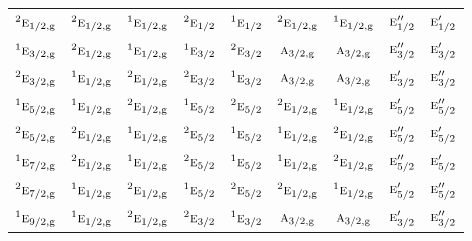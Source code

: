 \documentclass[10pt,a4paper]{article}
\numberwithin{equation}{section}
\newcommand{\irr}[1]{\text{\normalfont\scshape #1}}
\newcommand{\conjpair}[1]{{}^{#1}}
\newcommand{\ptag}[1]{\mathrm{#1}}
\begin{document}
{\begin{longtable}{@{}lcccccccc@{}}
$\conjpair{2}\irr{e}_{1/2,\ptag{g}}$ & $\conjpair{2}\irr{e}_{1/2,\ptag{g}}$ & $\conjpair{1}\irr{e}_{1/2,\ptag{g}}$ & $\conjpair{2}\irr{e}_{1/2}$ & $\conjpair{1}\irr{e}_{1/2}$ & $\conjpair{2}\irr{e}_{1/2,\ptag{g}}$ & $\conjpair{1}\irr{e}_{1/2,\ptag{g}}$ & $\irr{e}_{1/2}''$ & $\irr{e}_{1/2}'$\\
$\conjpair{1}\irr{e}_{3/2,\ptag{g}}$ & $\conjpair{2}\irr{e}_{1/2,\ptag{g}}$ & $\conjpair{1}\irr{e}_{1/2,\ptag{g}}$ & $\conjpair{1}\irr{e}_{3/2}$ & $\conjpair{2}\irr{e}_{3/2}$ & $\irr{a}_{3/2,\ptag{g}}$ & $\irr{a}_{3/2,\ptag{g}}$ & $\irr{e}_{3/2}''$ & $\irr{e}_{3/2}'$\\
$\conjpair{2}\irr{e}_{3/2,\ptag{g}}$ & $\conjpair{1}\irr{e}_{1/2,\ptag{g}}$ & $\conjpair{2}\irr{e}_{1/2,\ptag{g}}$ & $\conjpair{2}\irr{e}_{3/2}$ & $\conjpair{1}\irr{e}_{3/2}$ & $\irr{a}_{3/2,\ptag{g}}$ & $\irr{a}_{3/2,\ptag{g}}$ & $\irr{e}_{3/2}'$ & $\irr{e}_{3/2}''$\\
$\conjpair{1}\irr{e}_{5/2,\ptag{g}}$ & $\conjpair{1}\irr{e}_{1/2,\ptag{g}}$ & $\conjpair{2}\irr{e}_{1/2,\ptag{g}}$ & $\conjpair{1}\irr{e}_{5/2}$ & $\conjpair{2}\irr{e}_{5/2}$ & $\conjpair{2}\irr{e}_{1/2,\ptag{g}}$ & $\conjpair{1}\irr{e}_{1/2,\ptag{g}}$ & $\irr{e}_{5/2}'$ & $\irr{e}_{5/2}''$\\
$\conjpair{2}\irr{e}_{5/2,\ptag{g}}$ & $\conjpair{2}\irr{e}_{1/2,\ptag{g}}$ & $\conjpair{1}\irr{e}_{1/2,\ptag{g}}$ & $\conjpair{2}\irr{e}_{5/2}$ & $\conjpair{1}\irr{e}_{5/2}$ & $\conjpair{1}\irr{e}_{1/2,\ptag{g}}$ & $\conjpair{2}\irr{e}_{1/2,\ptag{g}}$ & $\irr{e}_{5/2}''$ & $\irr{e}_{5/2}'$\\
$\conjpair{1}\irr{e}_{7/2,\ptag{g}}$ & $\conjpair{2}\irr{e}_{1/2,\ptag{g}}$ & $\conjpair{1}\irr{e}_{1/2,\ptag{g}}$ & $\conjpair{2}\irr{e}_{5/2}$ & $\conjpair{1}\irr{e}_{5/2}$ & $\conjpair{1}\irr{e}_{1/2,\ptag{g}}$ & $\conjpair{2}\irr{e}_{1/2,\ptag{g}}$ & $\irr{e}_{5/2}''$ & $\irr{e}_{5/2}'$\\
$\conjpair{2}\irr{e}_{7/2,\ptag{g}}$ & $\conjpair{1}\irr{e}_{1/2,\ptag{g}}$ & $\conjpair{2}\irr{e}_{1/2,\ptag{g}}$ & $\conjpair{1}\irr{e}_{5/2}$ & $\conjpair{2}\irr{e}_{5/2}$ & $\conjpair{2}\irr{e}_{1/2,\ptag{g}}$ & $\conjpair{1}\irr{e}_{1/2,\ptag{g}}$ & $\irr{e}_{5/2}'$ & $\irr{e}_{5/2}''$\\
$\conjpair{1}\irr{e}_{9/2,\ptag{g}}$ & $\conjpair{1}\irr{e}_{1/2,\ptag{g}}$ & $\conjpair{2}\irr{e}_{1/2,\ptag{g}}$ & $\conjpair{2}\irr{e}_{3/2}$ & $\conjpair{1}\irr{e}_{3/2}$ & $\irr{a}_{3/2,\ptag{g}}$ & $\irr{a}_{3/2,\ptag{g}}$ & $\irr{e}_{3/2}'$ & $\irr{e}_{3/2}''$\\

\end{longtable}}
\end{document}
